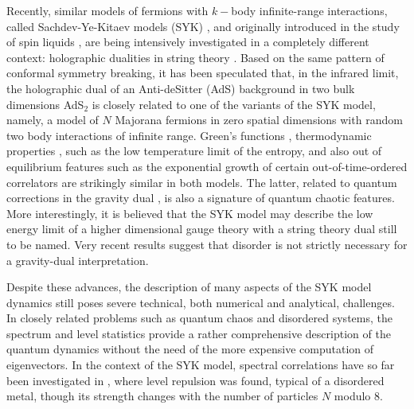 \documentclass[aps,showpacs,floatfix,superscriptaddress,pre,11pt]{revtex4-1}
\begin{document}
Recently, similar models of fermions with $k-$body infinite-range interactions, called Sachdev-Ye-Kitaev models (SYK)  \cite{kitaev2015,maldacena2016,polchinski2016,engels2016,almheiri2015,magan2016,danshita2016,garcia-alvarez2016,bagrets2016,sachdev2015,you2016,Gross:2016kjj}, and originally introduced in the study of spin liquids \cite{sachdev1993}, are being intensively investigated in a completely different context: holographic dualities in string theory \cite{maldacena1998}. 
Based on the same pattern of conformal symmetry breaking, it has been speculated \cite{kitaev2015,maldacena2016,polchinski2016,engels2016,almheiri2015,jensen2016,cvetic2016} that, in the infrared limit, the holographic dual of an Anti-deSitter (AdS) background in two bulk dimensions AdS$_2$ is closely related to one of the variants of the SYK model, namely, a model of $N$ Majorana fermions \cite{kitaev2015} in zero spatial dimensions with random two body interactions of infinite range. Green's functions \cite{bagrets2016,jevicki2016,maldacena2016,polchinski2016}, thermodynamic properties \cite{sachdev2015}, such as the low temperature limit of the entropy, and also out of equilibrium features \cite{maldacena2016} such as the exponential growth of certain out-of-time-ordered correlators are strikingly similar in both models. The latter, related to quantum corrections in the gravity dual \cite{maldacena2015}, is also a signature of quantum chaotic features. More interestingly, it is believed that the SYK model may describe the low energy limit of a higher dimensional gauge theory with a string theory dual still to be named.
Very recent results \cite{witten2016} suggest that disorder is not strictly necessary for a gravity-dual interpretation.

Despite these advances, the description of many aspects of the SYK model dynamics still poses severe technical, both numerical and analytical, challenges.
In closely related problems such as quantum chaos and disordered systems, the spectrum and level statistics provide a rather comprehensive
description
of the quantum dynamics without the need of the more expensive computation of eigenvectors. 
In the context of the SYK model, spectral correlations
have so far been investigated in \cite{you2016}, where level repulsion was found,
typical of a disordered metal, though its strength changes with  the number of particles $N$ modulo 8. 
\end{document}
